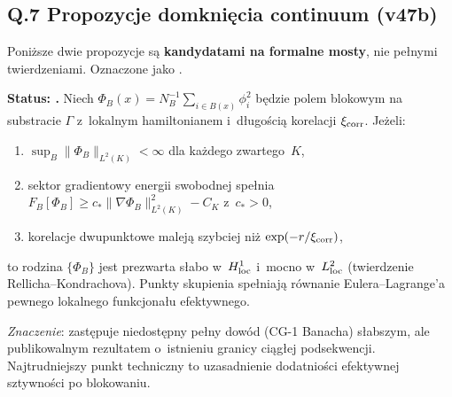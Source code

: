 \subsection*{Q.7 Propozycje domkni\k{e}cia continuum (v47b)}
\label{ssec:Q-continuum-proposals}

Poni\.zsze dwie propozycje s\k{a} \textbf{kandydatami na formalne mosty},
nie pe\l{}nymi twierdzeniami. Oznaczone jako .

\begin{proposition}%
\label{prop:Q-weak-continuum}
\textbf{Status: .}
Niech $\Phi_B(x) = N_B^{-1}\sum_{i \in B(x)} \phi_i^2$
b\k{e}dzie polem blokowym na substracie $\Gamma$
z~lokalnym hamiltonianem i~d\l{}ugo\'sci\k{a} korelacji $\xi_{\rm corr}$.
Je\.zeli:
\begin{enumerate}[nosep]
  \item $\sup_B \|\Phi_B\|_{L^2(K)} < \infty$ dla ka\.zdego
    zwartego~$K$,
  \item sektor gradientowy energii swobodnej spe\l{}nia
    $F_B[\Phi_B] \ge c_* \|\nabla\Phi_B\|^2_{L^2(K)} - C_K$
    z~$c_* > 0$,
  \item korelacje dwupunktowe malej\k{a} szybciej ni\.z
    $\exp(-r/\xi_{\rm corr})$,
\end{enumerate}
to rodzina $\{\Phi_B\}$ jest prezwarta s\l{}abo w~$H^1_{\rm loc}$
i~mocno w~$L^2_{\rm loc}$ (twierdzenie Rellicha--Kondrachova).
Punkty skupienia spe\l{}niaj\k{a} r\'ownanie Eulera--Lagrange'a
pewnego lokalnego funkcjona\l{}u efektywnego.

\medskip\noindent
\textit{Znaczenie}: zast\k{e}puje niedost\k{e}pny pe\l{}ny dow\'od
(CG-1 Banacha) s\l{}abszym, ale publikowalnym rezultatem
o~istnieniu granicy ci\k{a}g\l{}ej podsekwencji.
Najtrudniejszy punkt techniczny to uzasadnienie
dodatnio\'sci efektywnej sztywno\'sci po blokowaniu.
\end{proposition}

